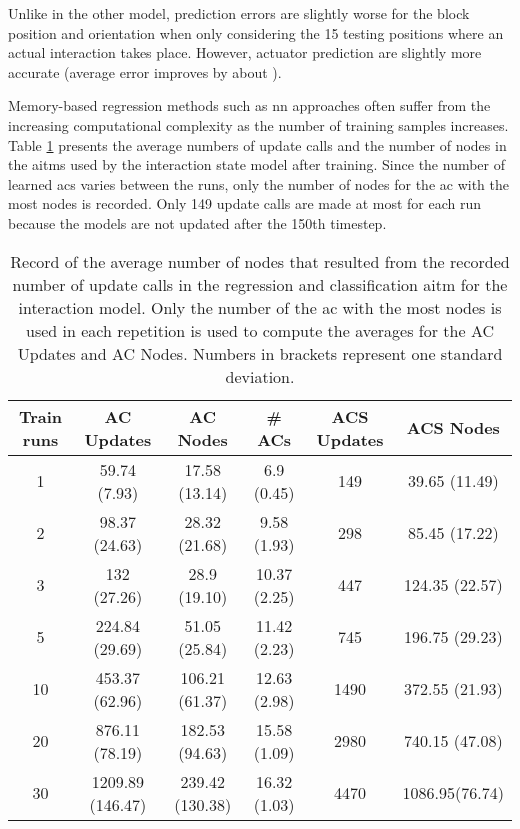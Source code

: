 Unlike in the other model, prediction errors are slightly worse for the block position and orientation when only considering the 15 testing positions where an actual interaction takes place. However, actuator prediction are slightly more accurate (average error improves by about ).

Memory-based regression methods such as \gls{nn} approaches often suffer from the increasing computational complexity as the number of training samples increases.
Table \ref{tab:learnCurveInteractionNodes} presents the average numbers of update calls and the number of nodes in the \glspl{aitm} used by the interaction state model after training. Since the number of learned \glspl{ac} varies between the runs, only the number of nodes for the \gls{ac} with the most nodes is recorded. Only 149 update calls are made at most for each run because the models are not updated after the 150th timestep.

\begin{table}
\footnotesize 
	\centering
	\begin{tabular*}{\textwidth}{@{\extracolsep{\fill}} c c c c c c}
			\hline \textbf{Train runs} & \textbf{AC Updates}&  \textbf{AC Nodes} & \textbf{\# ACs} & \textbf{ACS Updates} &\textbf{ACS Nodes} \\ 
			\hline \hline 
			 1 & 59.74 (7.93) & 17.58 (13.14) & 6.9 (0.45) & 149 & 39.65 (11.49) \\
			 2 & 98.37 (24.63) & 28.32 (21.68) & 9.58 (1.93) & 298 & 85.45 (17.22) \\  
			 3 & 132 (27.26) & 28.9 (19.10) & 10.37 (2.25) & 447 & 124.35 (22.57) \\
			 5 & 224.84 (29.69) & 51.05 (25.84) & 11.42 (2.23) & 745 & 196.75 (29.23) \\
			 10 & 453.37 (62.96) & 106.21 (61.37) & 12.63 (2.98) & 1490 & 372.55 (21.93) \\
			 20 & 876.11 (78.19) & 182.53 (94.63) & 15.58 (1.09) & 2980 & 740.15 (47.08) \\
			 30 & 1209.89 (146.47) & 239.42 (130.38) & 16.32 (1.03) & 4470 & 1086.95(76.74) \\
			\hline 
	\end{tabular*} 
	\caption{Record of the average number of nodes that resulted from the recorded number of update calls in the regression and classification \gls{aitm} for the interaction model. Only the number of the \gls{ac} with the most nodes is used in each repetition is used to compute the averages for the AC Updates and AC Nodes. Numbers in brackets represent one standard deviation.}
	\label{tab:learnCurveInteractionNodes}
\end{table}

